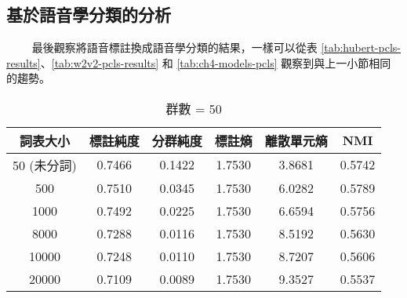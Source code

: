 \subsection{基於語音學分類的分析}

　　
最後觀察將語音標註換成語音學分類的結果，一樣可以從表 \ref{tab:hubert-pcls-results}、\ref{tab:w2v2-pcls-results} 和 \ref{tab:ch4-models-pcls} 觀察到與上一小節相同的趨勢。

        \begin{table}[!htbp]
            \centering
            \begin{subtable}[t]{\textwidth}
                \centering
                \begin{tabular}{|c|c|c|c|c|c|} \hline 
                        詞表大小  & 標註純度 & 分群純度 & 標註熵 & 離散單元熵 &     NMI   \\ \hline 
                       50 (未分詞)&   0.7466  &  0.1422 & 1.7530 &   3.8681 &  0.5742 \\ \hline 
                           500    &  0.7510  &  0.0345  & 1.7530 &  6.0282  &     0.5789  \\ \hline 
                          1000    &  0.7492  &  0.0225  & 1.7530 &  6.6594  &     0.5756  \\ \hline 
                          8000    &  0.7288  &  0.0116  & 1.7530 &  8.5192  &     0.5630  \\ \hline 
                         10000    &  0.7248  &  0.0110  & 1.7530 &  8.7207  &     0.5606  \\ \hline 
                         20000    &  0.7109  &  0.0089  & 1.7530 &  9.3527  &     0.5537  \\ \hline 
                \end{tabular}
\caption{群數 = 50}
                \label{tab:ch4-hubert-pcls-clu050}
            \end{subtable}        

            \vspace{0.01cm}        


\end{table}
